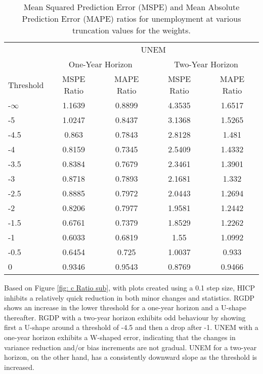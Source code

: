 \documentclass[11pt]{article}
\begin{document}
	\begin{table}[!h]
		\centering
		\caption{Mean Squared Prediction Error (MSPE) and Mean Absolute Prediction Error (MAPE) ratios for unemployment at various truncation values for the weights.}
		\label{tab: c MSPE UNEM}
		\begin{tabular}{lcccc}
			\hline\hline
			&                        \multicolumn{4}{c}{UNEM}                         \\
			\cmidrule(lr){2-5}                              & \multicolumn{2}{c}{One-Year Horizon} & \multicolumn{2}{c}{Two-Year Horizon} \\
			\cmidrule(lr){2-3} \cmidrule(lr){4-5}
			Threshold & MSPE Ratio &    MAPE Ratio    & MSPE Ratio &    MAPE Ratio    \\ \hline
			-$\infty$ & 1.1639 & 0.8899 & 4.3535 & 1.6517\\ 
			-5 & 1.0247 & 0.8437 & 3.1368 & 1.5265\\ 
			-4.5 & 0.863 & 0.7843 & 2.8128 & 1.481\\ 
			-4 & 0.8159 & 0.7345 & 2.5409 & 1.4332\\ 
			-3.5 & 0.8384 & 0.7679 & 2.3461 & 1.3901\\ 
			-3 & 0.8718 & 0.7893 & 2.1681 & 1.332\\ 
			-2.5 & 0.8885 & 0.7972 & 2.0443 & 1.2694\\ 
			-2 & 0.8206 & 0.7977 & 1.9581 & 1.2442\\ 
			-1.5 & 0.6761 & 0.7379 & 1.8529 & 1.2262\\ 
			-1 & 0.6033 & 0.6819 & 1.55 & 1.0992\\ 
			-0.5 & 0.6454 & 0.725 & 1.0037 & 0.933\\ 
			0 & 0.9346 & 0.9543 & 0.8769 & 0.9466\\ 
			\hline\hline
		\end{tabular}
	\end{table}
	
	Based on Figure \ref{fig: c Ratio sub}, with plots created using a 0.1 step size, HICP inhibits a relatively quick reduction in both minor changes and statistics. RGDP shows an increase in the lower threshold for a one-year horizon and a U-shape thereafter. RGDP with a two-year horizon exhibits odd behaviour by showing first a U-shape around a threshold of -4.5 and then a drop after -1. UNEM with a one-year horizon exhibits a W-shaped error, indicating that the changes in variance reduction and/or bias increments are not gradual. UNEM for a two-year horizon, on the other hand, has a consistently downward slope as the threshold is increased.
	
\end{document}

